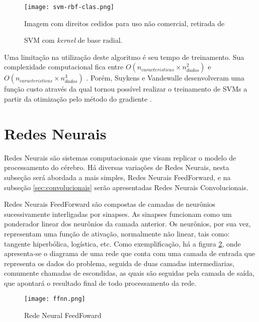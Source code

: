 \begin{figure}
\begin{center} {
    \begin{center}
    \texttt{[image: svm-rbf-clas.png]}
    \caption{SVM com \textit{kernel} de base radial.}
    \small Imagem com direitos cedidos para uso não comercial, retirada de \cite{vanderplas15}
    \label{fig:svm-rbf-clas}
    \end{center}
}
\end{center}
\end{figure}

Uma limitação na utilização deste algoritmo é seu tempo de treinamento. Sua complexidade computacional fica entre $O(n_{caracteristicas} \times n_{dados}^2)$ e $O(n_{caracteristicas} \times n_{dados}^3)$ \cite{list09}. Porém, Suykens e Vandewalle desenvolveram uma função custo através da qual tornou possível realizar o treinamento de SVMs a partir da otimização pelo método do gradiente \cite{suykens99}.

\section{Redes Neurais}

Redes Neurais são sistemas computacionais que visam replicar o modelo de processamento do cérebro. Há diversas variações de Redes Neurais, nesta subseção será abordada a mais simples, Redes Neurais FeedForward, e na subseção \ref{sec:convolucionais} serão apresentadas Redes Neurais Convolucionais.

Redes Neurais FeedForward são compostas de camadas de neurônios sucessivamente interligadas por sinapses. As sinapses funcionam como um ponderador linear dos neurônios da camada anterior. Os neurônios, por sua vez, representam uma função de ativação, normalmente não linear, tais como: tangente hiperbólica, logística, etc. Como exemplificação, há a figura \ref{fig:ff-neural-net}, onde apresenta-se o diagrama de uma rede que conta com uma camada de entrada que representa os dados do problema, seguida de duas camadas intermediarias, comumente chamadas de escondidas, as quais são seguidas pela camada de saída, que apontará o resultado final de todo processamento da rede.

\begin{figure}
\begin{center} {
    \begin{center}
    \texttt{[image: ffnn.png]}
    \caption{Rede Neural FeedFoward}
    \label{fig:ff-neural-net}
    \end{center}
}
\end{center}
\end{figure}

